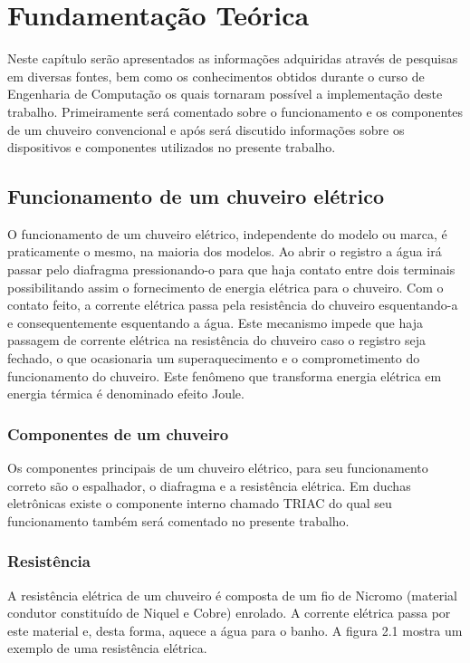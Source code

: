 \chapter{Fundamentação Teórica}

Neste capítulo  serão apresentados as informações adquiridas através de pesquisas em diversas fontes, bem como os conhecimentos obtidos durante o curso de Engenharia de Computação os quais tornaram possível a implementação deste trabalho. Primeiramente será comentado sobre o funcionamento e os componentes de um chuveiro convencional e após será discutido informações sobre os dispositivos e componentes utilizados no presente trabalho.

\section{Funcionamento de um chuveiro elétrico}

O funcionamento de um chuveiro elétrico, independente do modelo ou marca, é praticamente o mesmo, na maioria dos modelos. Ao abrir o registro a água irá passar pelo diafragma pressionando-o para que haja contato entre dois terminais possibilitando assim o fornecimento de energia elétrica para o chuveiro. Com o contato feito, a corrente elétrica passa pela resistência do chuveiro esquentando-a e consequentemente esquentando a água. Este mecanismo impede que haja passagem de corrente elétrica na resistência do chuveiro caso o registro seja fechado, o que ocasionaria um superaquecimento e o comprometimento do funcionamento do chuveiro. Este fenômeno que transforma energia elétrica em energia térmica é denominado efeito Joule.

\subsection{Componentes de um chuveiro}

Os componentes principais de um chuveiro elétrico, para seu funcionamento correto são o espalhador, o diafragma e a resistência elétrica. Em duchas eletrônicas existe o componente interno chamado TRIAC do qual seu funcionamento também será comentado no presente trabalho.

\subsection{Resistência}

A resistência elétrica de um chuveiro é composta de um fio de Nicromo (material condutor constituído de Niquel e Cobre) enrolado. A corrente elétrica passa por este material e, desta forma, aquece a água para o banho. A figura 2.1 mostra um exemplo de uma resistência elétrica.

